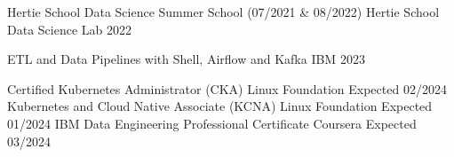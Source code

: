 

\begin{cvhonors}
  \cvhonor
    {Hertie School Data Science Summer School (07/2021 \& 08/2022)} %
    {Hertie School Data Science Lab} %
    {} %
    {2022} %

  \cvhonor
    {ETL and Data Pipelines with Shell, Airflow and Kafka} %
    {IBM} %
    {} %
    {2023} %


  \cvhonor
    {Certified Kubernetes Administrator (CKA)} %
    {Linux Foundation} %
    {} %
    {Expected 02/2024} %
  \cvhonor
    {Kubernetes and Cloud Native Associate (KCNA)} %
    {Linux Foundation} %
    {} %
    {Expected 01/2024} %
  \cvhonor
    {IBM Data Engineering Professional Certificate} %
    {Coursera} %
    {} %
    {Expected 03/2024} %
\end{cvhonors}
